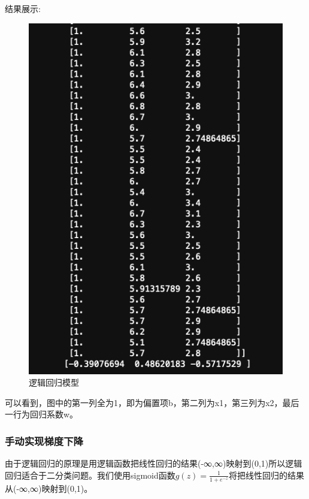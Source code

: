 \documentclass[12pt,a4paper,oneside]{article}
\begin{document}
结果展示:
\begin{figure}[H]
    \centering
    \begin{minipage}{0.4\textwidth}
        \centering
        \includegraphics[width=\textwidth]{image/2} %
        \caption{逻辑回归模型}
        \label{fig:image2}
    \end{minipage}
\end{figure}
可以看到，图中的第一列全为1，即为偏置项b，第二列为x1，第三列为x2，最后一行为回归系数w。

\subsubsection{手动实现梯度下降}

\qquad 由于逻辑回归的原理是用逻辑函数把线性回归的结果(-∞,∞)映射到(0,1)所以逻辑回归适合于二分类问题。我们使用sigmoid函数$g(z)=\frac{1}{1+e^{-z}}$将把线性回归的结果从(-∞,∞)映射到(0,1)。  
\end{document}
